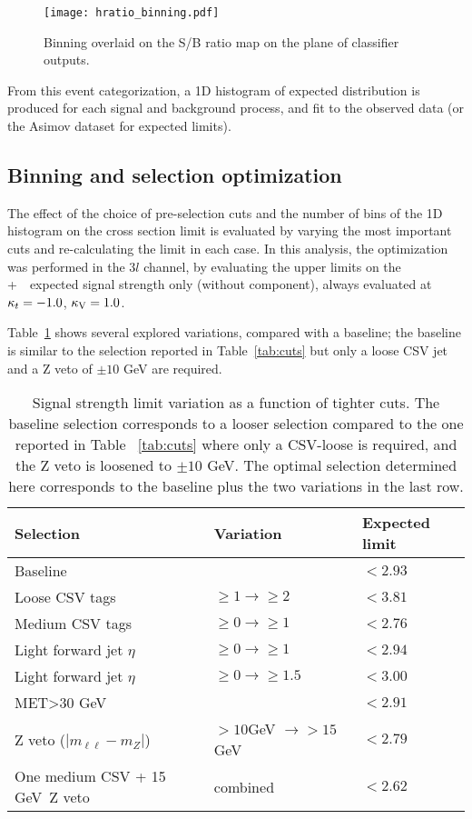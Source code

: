 \begin{figure} [!h]
 \centering
 \texttt{[image: hratio\_binning.pdf]}
\caption{Binning overlaid on the S/B ratio map on the plane of classifier outputs.}
\label{fig:binning}
\end{figure}

From this event categorization, a 1D histogram of expected distribution is produced for each signal and background process, and fit to the observed data (or the Asimov dataset for expected limits).

\subsection{Binning and selection optimization}\label{sec:binopt}

The effect of the choice of pre-selection cuts and the number of bins of the 1D histogram on the cross section limit is evaluated by varying the most important cuts and re-calculating the limit in each case. In this analysis, the optimization was performed in the $3l$ channel, by evaluating the upper limits on the \tHq+\ \tHW\ expected signal strength only (without \ttH component), always evaluated at $\kappa_t=-1.0$, $\kappa_\text{V}=1.0$.

Table~\ref{cut_limit} shows several explored variations, compared with a baseline; the baseline is similar to the selection reported in Table~\ref{tab:cuts} but only a loose CSV jet and a Z veto of $\pm10$ GeV are required. 

\begin{table}[h!]
\centering
\begin{tabular}{lll}
Selection                         & Variation                & Expected limit \\ \hline
Baseline                          &                          & $<2.93$\\
Loose CSV tags                    & $\geq 1 \to \geq 2$      & $<3.81$\\
Medium CSV tags                   & $\geq 0 \to \geq 1$      & $<2.76$\\
Light forward jet $\eta$          & $\geq 0 \to \geq 1$      & $<2.94$\\
Light forward jet $\eta$          & $\geq 0 \to \geq 1.5$    & $<3.00$\\
MET>30 GeV                        &                          & $<2.91$\\
Z veto ($|m_{\ell\ell}-m_Z|$)     & $>10$GeV $\to >15$ GeV   & $<2.79$\\
One medium CSV + 15 GeV\ Z veto   & combined                 & $<2.62$\\\hline
\end{tabular}
\caption[Selection cuts optimization.]{Signal strength limit variation as a function of tighter cuts. The baseline selection corresponds to a looser selection compared to the one reported in Table ~\ref{tab:cuts} where only a CSV-loose \bjet is required, and the Z veto is loosened to $\pm10$ GeV. The optimal selection determined here corresponds to the baseline plus the two variations in the last row.}
\label{cut_limit}
\end{table}

